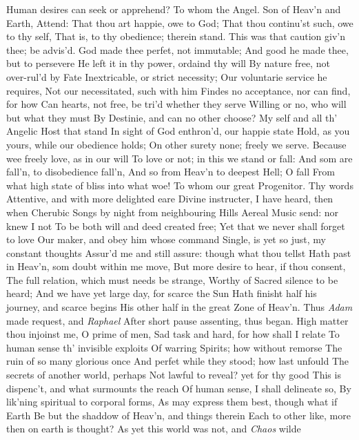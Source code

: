 \documentclass[11pt]{book}
\newcounter {last}
\begin{document}
Human desires can seek or apprehend? 
\quad To whom the Angel.  Son of Heav'n and Earth, 
Attend: That thou art happie, owe to God; 
That thou continu'st such, owe to thy self, 
That is, to thy obedience; therein stand. 
This was that caution giv'n thee; be advis'd. 
God made thee perfet, not immutable; 
And good he made thee, but to persevere 
He left it in thy power, ordaind thy will 
By nature free, not over-rul'd by Fate 
Inextricable, or strict necessity; 
Our voluntarie service he requires, 
Not our necessitated, such with him 
Findes no acceptance, nor can find, for how 
Can hearts, not free, be tri'd whether they serve 
Willing or no, who will but what they must 
By Destinie, and can no other choose? 
My self and all th' Angelic Host that stand 
In sight of God enthron'd, our happie state 
Hold, as you yours, while our obedience holds; 
On other surety none; freely we serve. 
Because wee freely love, as in our will 
To love or not; in this we stand or fall: 
And som are fall'n, to disobedience fall'n, 
And so from Heav'n to deepest Hell; O fall 
From what high state of bliss into what woe! 
\quad To whom our great Progenitor.  Thy words 
Attentive, and with more delighted eare 
Divine instructer, I have heard, then when 
Cherubic Songs by night from neighbouring Hills 
Aereal Music send: nor knew I not 
To be both will and deed created free; 
Yet that we never shall forget to love 
Our maker, and obey him whose command 
Single, is yet so just, my constant thoughts 
Assur'd me and still assure: though what thou tellst 
Hath past in Heav'n, som doubt within me move, 
But more desire to hear, if thou consent, 
The full relation, which must needs be strange, 
Worthy of Sacred silence to be heard; 
And we have yet large day, for scarce the Sun 
Hath finisht half his journey, and scarce begins 
His other half in the great Zone of Heav'n. 
\quad Thus \textit{Adam} made request, and \textit{Raphael} 
After short pause assenting, thus began. 
\quad High matter thou injoinst me, O prime of men, 
Sad task and hard, for how shall I relate 
To human sense th' invisible exploits 
Of warring Spirits; how without remorse 
The ruin of so many glorious once 
And perfet while they stood; how last unfould 
The secrets of another world, perhaps 
Not lawful to reveal? yet for thy good 
This is dispenc't, and what surmounts the reach 
Of human sense, I shall delineate so, 
By lik'ning spiritual to corporal forms, 
As may express them best, though what if Earth 
Be but the shaddow of Heav'n, and things therein 
Each to other like, more then on earth is thought? 
\quad As yet this world was not, and \textit{Chaos} wilde 
\end{document}
